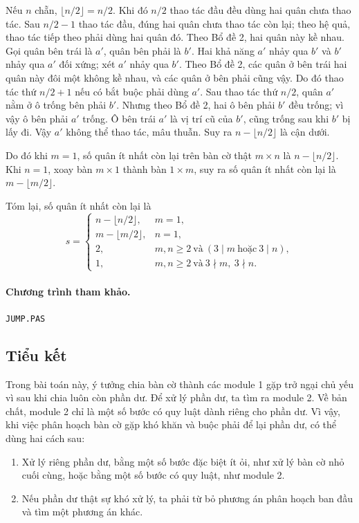 \documentclass[11pt]{article}
\begin{document}
Nếu \(n\) chẵn, \(\lfloor n/2\rfloor=n/2\). Khi đó \(n/2\) thao tác đầu đều
dùng hai quân chưa thao tác. Sau \(n/2-1\) thao tác đầu, đúng hai quân chưa
thao tác còn lại; theo hệ quả, thao tác tiếp theo phải dùng hai quân đó. Theo
Bổ đề 2, hai quân này kề nhau. Gọi quân bên trái là \(a'\), quân bên phải là
\(b'\). Hai khả năng \(a'\) nhảy qua \(b'\) và \(b'\) nhảy qua \(a'\) đối
xứng; xét \(a'\) nhảy qua \(b'\). Theo Bổ đề 2, các quân ở bên trái hai quân
này đôi một không kề nhau, và các quân ở bên phải cũng vậy. Do đó thao tác thứ
\(n/2+1\) nếu có bắt buộc phải dùng \(a'\). Sau thao tác thứ \(n/2\), quân
\(a'\) nằm ở ô trống bên phải \(b'\). Nhưng theo Bổ đề 2, hai ô bên phải
\(b'\) đều trống; vì vậy ô bên phải \(a'\) trống. Ô bên trái \(a'\) là vị trí
cũ của \(b'\), cũng trống sau khi \(b'\) bị lấy đi. Vậy \(a'\) không thể thao
tác, mâu thuẫn. Suy ra \(n-\lfloor n/2\rfloor\) là cận dưới.

Do đó khi \(m=1\), số quân ít nhất còn lại trên bàn cờ thật \(m\times n\) là
\(n-\lfloor n/2\rfloor\). Khi \(n=1\), xoay bàn \(m\times 1\) thành bàn
\(1\times m\), suy ra số quân ít nhất còn lại là
\(m-\lfloor m/2\rfloor\).

Tóm lại, số quân ít nhất còn lại là
\[
s=
\begin{cases}
  n-\lfloor n/2\rfloor, & m=1,\\
  m-\lfloor m/2\rfloor, & n=1,\\
  2, & m,n\ge 2\ \text{và}\ (3\mid m\ \text{hoặc}\ 3\mid n),\\
  1, & m,n\ge 2\ \text{và}\ 3\nmid m,\ 3\nmid n.
\end{cases}
\]

\paragraph{Chương trình tham khảo.}
\texttt{JUMP.PAS}

\subsection{Tiểu kết}

Trong bài toán này, ý tưởng chia bàn cờ thành các module 1 gặp trở ngại chủ
yếu vì sau khi chia luôn còn phần dư. Để xử lý phần dư, ta tìm ra module 2. Về
bản chất, module 2 chỉ là một số bước có quy luật dành riêng cho phần dư. Vì
vậy, khi việc phân hoạch bàn cờ gặp khó khăn và buộc phải để lại phần dư, có
thể dùng hai cách sau:
\begin{enumerate}
  \item Xử lý riêng phần dư, bằng một số bước đặc biệt ít ỏi, như xử lý bàn cờ
  nhỏ cuối cùng, hoặc bằng một số bước có quy luật, như module 2.
  \item Nếu phần dư thật sự khó xử lý, ta phải từ bỏ phương án phân hoạch ban
  đầu và tìm một phương án khác.
\end{enumerate}
\end{document}

